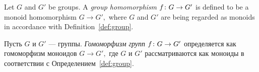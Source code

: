 \documentclass[../main/CT4S-EN-RU]{subfiles}
\begin{document}
\begin{definitionENG}\label{def:group homomorphism}
Let $G$ and $G'$ be groups. A {\em group homomorphism} $f\colon G\rightarrow G'$ is defined to be a monoid homomorphism $G\to G',$ where $G$ and $G'$ are being regarded as monoids in accordance with Definition~\ref{def:group}.
\end{definitionENG}

\begin{definitionRUS}\label{def:group homomorphism}
Пусть $G$ и $G'$ — группы. {\em Гомоморфизм групп} $f\colon G\rightarrow G'$ определяется как гомоморфизм моноидов $G\to G',$ где $G$ и $G'$ рассматриваются как моноиды в соответствии с Определением~\ref{def:group}.
\end{definitionRUS}
\end{document}
